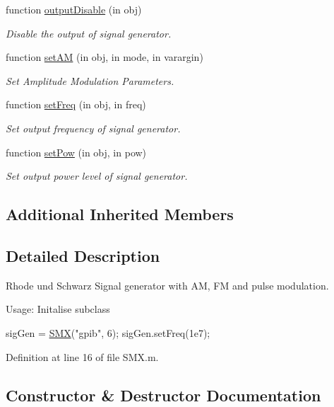 \begin{DoxyCompactItemize}
function \hyperlink{class_s_m_x_a8488e3aee6732ac028ff5cceaa6b92b7}{output\+Disable} (in obj)
\begin{DoxyCompactList}\small\item\em Disable the output of signal generator. \end{DoxyCompactList}\item 
function \hyperlink{class_s_m_x_a948280cfa337b1fd49aed6fad1e23f01}{set\+AM} (in obj, in mode, in varargin)
\begin{DoxyCompactList}\small\item\em Set Amplitude Modulation Parameters. \end{DoxyCompactList}\item 
function \hyperlink{class_s_m_x_a7363c5f4d6937d4e6c8f81a7e64bfa4d}{set\+Freq} (in obj, in freq)
\begin{DoxyCompactList}\small\item\em Set output frequency of signal generator. \end{DoxyCompactList}\item 
function \hyperlink{class_s_m_x_a93851e9f9277b0959115b8d1486c0d3c}{set\+Pow} (in obj, in pow)
\begin{DoxyCompactList}\small\item\em Set output power level of signal generator. \end{DoxyCompactList}\end{DoxyCompactItemize}
\subsection*{Additional Inherited Members}


\subsection{Detailed Description}
Rhode und Schwarz Signal generator with AM, FM and pulse modulation. 

Usage\+: Initalise subclass 
\begin{DoxyCode}
sigGen = \hyperlink{class_s_m_x_ade343b92e0901e72f0718f18bfbbb867}{SMX}(\textcolor{stringliteral}{"gpib"},%
             6); %
sigGen.setFreq(1e7);
\end{DoxyCode}
 

Definition at line 16 of file S\+M\+X.\+m.



\subsection{Constructor \& Destructor Documentation}
\mbox{\label{class_s_m_x_ade343b92e0901e72f0718f18bfbbb867}} 
